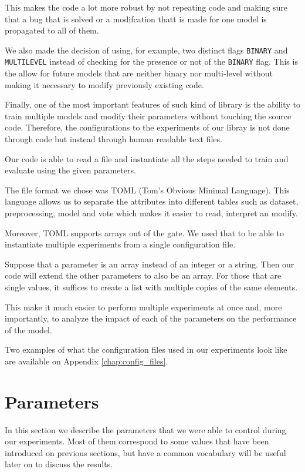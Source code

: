 This makes the code a lot more robust by not repeating code and making sure that a bug that is solved or a modifcation thatt is made for one model is propagated to all of them.

We also made the decision of using, for example, two distinct flags \verb|BINARY| and \\ \verb|MULTILEVEL| instead of checking for the presence or not of the \verb|BINARY| flag.
This is the allow for future models that are neither binary nor multi-level without making it necessary to modify previously existing code.

Finally, one of the most important features of such kind of library is the ability to train multiple models and modify their parameters without touching the source code.
Therefore, the configurations to the experiments of our libray is not done through code but instead through human readable text files.

Our code is able to read a file and instantiate all the steps needed to train and evaluate using the given parameters.

The file format we chose was TOML (Tom's Obvious Minimal Language).
This language allows us to separate the attributes into different tables such as dataset, preprocessing, model and vote which makes it easier to read, interpret an modify.

Moreover, TOML supports arrays out of the gate.
We used that to be able to instantiate multiple experiments from a single configuration file.

Suppose that a parameter is an array instead of an integer or a string.
Then our code will extend the other parameters to also be an array.
For those that are single values, it suffices to create a list with multiple copies of the same elements.

This make it much easier to perform multiple experiments at once and, more importantly, to analyze the impact of each of the parameters on the performance of the model.

Two examples of what the configuration files used in our experiments look like are available on Appendix \ref{chap:config_files}.

\section{Parameters}

In this section we describe the parameters that we were able to control during our experiments.
Most of them correspond to some values that have been introduced on previous sections, but have a common vocabulary will be useful later on to discuss the results.

